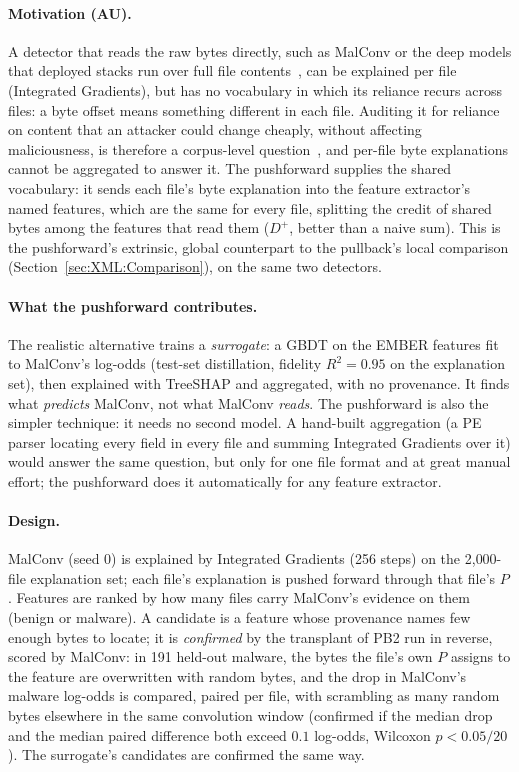 \paragraph{Motivation (AU).} A detector that reads the raw bytes directly, such as MalConv or the deep models that deployed stacks run over full file contents~\cite{microsoft2019insideout}, can be explained per file (Integrated Gradients), but has no vocabulary in which its reliance recurs across files: a byte offset means something different in each file. Auditing it for reliance on content that an attacker could change cheaply, without affecting maliciousness, is therefore a corpus-level question~\cite{arp2022and}, and per-file byte explanations cannot be aggregated to answer it. The pushforward supplies the shared vocabulary: it sends each file's byte explanation into the feature extractor's named features, which are the same for every file, splitting the credit of shared bytes among the features that read them ($D^{+}$, better than a naive sum). This is the pushforward's extrinsic, global counterpart to the pullback's local comparison (Section~\ref{sec:XML:Comparison}), on the same two detectors.

\paragraph{What the pushforward contributes.} The realistic alternative trains a \textit{surrogate}: a GBDT on the EMBER features fit to MalConv's log-odds (test-set distillation, fidelity $R^2 = 0.95$ on the explanation set), then explained with TreeSHAP and aggregated, with no provenance. It finds what \emph{predicts} MalConv, not what MalConv \emph{reads}. The pushforward is also the simpler technique: it needs no second model. A hand-built aggregation (a PE parser locating every field in every file and summing Integrated Gradients over it) would answer the same question, but only for one file format and at great manual effort; the pushforward does it automatically for any feature extractor.

\paragraph{Design.} MalConv (seed 0) is explained by Integrated Gradients (256 steps) on the 2{,}000-file explanation set; each file's explanation is pushed forward through that file's $P$. Features are ranked by how many files carry MalConv's evidence on them (benign or malware). A candidate is a feature whose provenance names few enough bytes to locate; it is \textit{confirmed} by the transplant of PB2 run in reverse, scored by MalConv: in 191 held-out malware, the bytes the file's own $P$ assigns to the feature are overwritten with random bytes, and the drop in MalConv's malware log-odds is compared, paired per file, with scrambling as many random bytes elsewhere in the same convolution window (confirmed if the median drop and the median paired difference both exceed $0.1$ log-odds, Wilcoxon $p < 0.05/20$). The surrogate's candidates are confirmed the same way.

